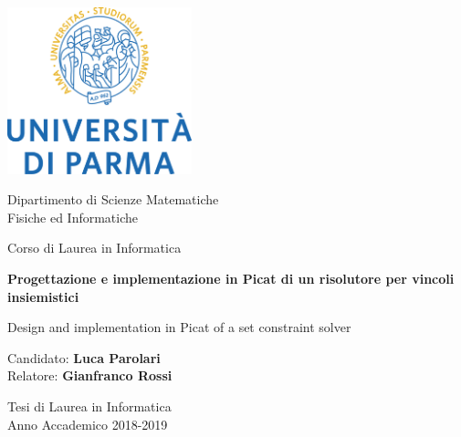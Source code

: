 \documentclass[12pt,a4paper,openright]{book} %
\begin{document}
\begin{titlepage}
    \begin{center}       
        \includegraphics[width=0.4\textwidth]{img/logo_unipr.png}

		\vspace{0.5cm}
		
		\Large
        Dipartimento di Scienze Matematiche\\
        Fisiche ed Informatiche

        \vspace{0.5cm}
        
        \Large
        Corso di Laurea in Informatica 
		
		\vspace{1.2cm} 
 
        \Huge
        \textbf{Progettazione e implementazione in Picat di un risolutore per vincoli insiemistici}
 
        \vspace{1cm}
        \LARGE
        Design and implementation in Picat of a set constraint solver 
 
        \vspace{1.2cm}
 
		\large Candidato: \Large\textbf{Luca Parolari}\\
		\large Relatore: \Large\textbf{Gianfranco Rossi}
	
		
        \vfill
 		
 		\large
        Tesi di Laurea in Informatica\\
        Anno Accademico 2018-2019
 
    \end{center}
\end{titlepage}
\end{document}
